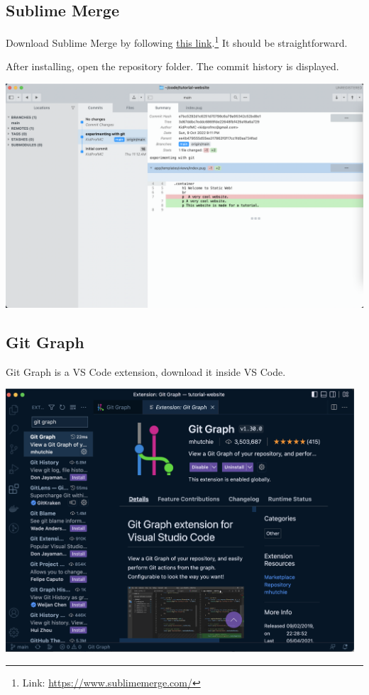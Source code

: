 \subsection*{Sublime Merge}

Download Sublime Merge by following \href{https://www.sublimemerge.com/}{this link}.\footnote{Link: \url{https://www.sublimemerge.com/}} It should be straightforward. 

After installing, open the repository folder. The commit history is displayed.

\begin{center}
\includegraphics[width=15cm]{images/ch3-sublimemerge.png}
\end{center}

\subsection*{Git Graph}

Git Graph is a VS Code extension, download it inside VS Code.

\begin{center}
\includegraphics[width=13cm]{images/ch3-gitgraph0.png}
\end{center}

